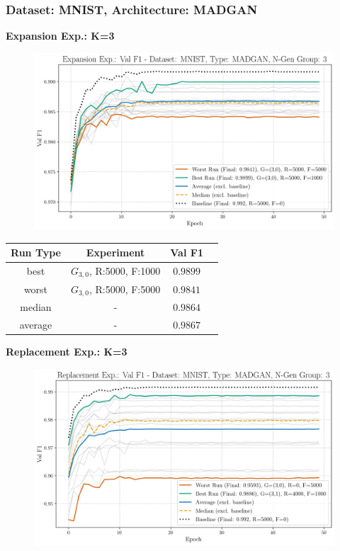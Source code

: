 \subsubsection{Dataset: MNIST, Architecture: MADGAN}
\noindent\textbf{Expansion Exp.: K=3}
\begin{figure}[htbp]
	\centering
	\includegraphics[width=.85\textwidth]{abb/strat_classifier_performance/MNIST_STRATIFIED_CLASSIFIERS_MADGAN_NEW/expansion_experiments/val_f1_score_MADGAN_MNIST_n_gen_3_all.png}
	\label{fig:app_strat_class_performance_expansion_exp._val_f1_score_3}
\end{figure}
\begin{table}[H]
	\vspace{-1.5em}
	\centering
	\begin{tabular}{|c|c|c|c|}
		\hline
		Run Type & Experiment & Val F1 \\ \hline
		best & \(G_{3, 0}\), R:5000, F:1000 & $0.9899$\\ \hline
		worst & \(G_{3, 0}\), R:5000, F:5000 & $0.9841$\\ \hline
		median & - & $0.9864$\\ \hline
		average & - & $0.9867$
		\\ \hline
	\end{tabular}
\end{table}
\noindent\textbf{Replacement Exp.: K=3}
\begin{figure}[htbp]
	\centering
	\includegraphics[width=.85\textwidth]{abb/strat_classifier_performance/MNIST_STRATIFIED_CLASSIFIERS_MADGAN_NEW/replacement_experiments/val_f1_score_MADGAN_MNIST_n_gen_3_all.png}
	\label{fig:app_strat_class_performance_replacement_exp._val_f1_score_3}
\end{figure}
